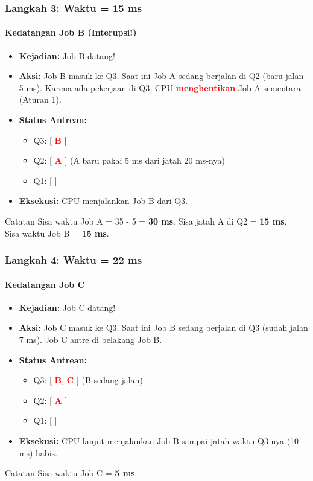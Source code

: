 \documentclass[t,aspectratio=169,xcolor=dvipsnames]{beamer}
\newcommand{\tem}[1]{\textbf{\textcolor{red}{#1}}}
\begin{document}
\begin{frame}
    \frametitle{Langkah 3: Waktu = 15 ms}
    \framesubtitle{Kedatangan Job B (Interupsi!)}
    \small
    \begin{itemize}
        \item \textbf{Kejadian:} Job B datang!
        \item \textbf{Aksi:} Job B masuk ke Q3. Saat ini Job A sedang berjalan di Q2 (baru jalan 5 ms). Karena ada pekerjaan di Q3, CPU \tem{menghentikan} Job A sementara (Aturan 1).
        \item \textbf{Status Antrean:}
        \begin{itemize}
            \item Q3: [ \tem{B} ]
            \item Q2: [ \tem{A} ] (A baru pakai 5 ms dari jatah 20 ms-nya)
            \item Q1: [ ]
        \end{itemize}
        \item \textbf{Eksekusi:} CPU menjalankan Job B dari Q3.
    \end{itemize}
    \vspace{0.3cm}
    \begin{exampleblock}{Catatan}
        Sisa waktu Job A = 35 - 5 = \textbf{30 ms}. Sisa jatah A di Q2 = \textbf{15 ms}.\\
        Sisa waktu Job B = \textbf{15 ms}.
    \end{exampleblock}
\end{frame}

\begin{frame}
    \frametitle{Langkah 4: Waktu = 22 ms}
    \framesubtitle{Kedatangan Job C}
    \small
    \begin{itemize}
        \item \textbf{Kejadian:} Job C datang!
        \item \textbf{Aksi:} Job C masuk ke Q3. Saat ini Job B sedang berjalan di Q3 (sudah jalan 7 ms). Job C antre di belakang Job B.
        \item \textbf{Status Antrean:}
        \begin{itemize}
            \item Q3: [ \tem{B}, \tem{C} ] (B sedang jalan)
            \item Q2: [ \tem{A} ]
            \item Q1: [ ]
        \end{itemize}
        \item \textbf{Eksekusi:} CPU lanjut menjalankan Job B sampai jatah waktu Q3-nya (10 ms) habis.
    \end{itemize}
    \vspace{0.3cm}
    \begin{exampleblock}{Catatan}
        Sisa waktu Job C = \textbf{5 ms}.
    \end{exampleblock}
\end{frame}
\end{document}
